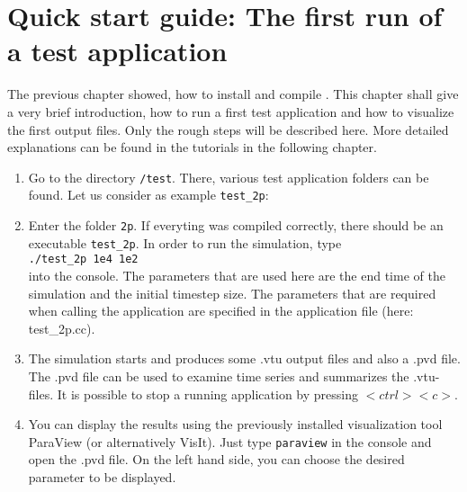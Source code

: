 \section[Quick start guide]{Quick start guide: The first run of a test application}\label{quick-start-guide}

The previous chapter showed, how to install and compile \Dumux. This chapter shall give a very brief introduction, how to run a first test application and how to visualize the first output files. Only the rough steps will be described here. More detailed explanations can be found in the tutorials in the following chapter.

\begin{enumerate}
 \item Go to the directory \texttt{/test}. There, various test application folders can be found. Let us consider as example \texttt{test{\_}2p}:
 \item Enter the folder \texttt{2p}. If everyting was compiled correctly, there should be an executable \texttt{test{\_}2p}. In order to run the simulation, type\\ 
\texttt{./test{\_}2p 1e4 1e2}\\
into the console. The parameters that are used here are the end time of the simulation and the initial timestep size. The parameters that are required when calling the application are specified in the application file (here: test{\_}2p.cc).
 \item The simulation starts and produces some .vtu output files and also a .pvd file. The .pvd file can be used to examine time series and summarizes the .vtu-files. It is possible to stop a running application by pressing $<ctrl><c>$.
 \item You can display the results using the previously installed visualization tool ParaView (or alternatively VisIt). Just type \texttt{paraview} in the console and open the .pvd file. On the left hand side, you can choose the desired parameter to be displayed.
\end{enumerate}
% 
%
%


